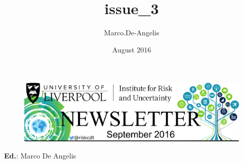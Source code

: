 \documentclass[11pt]{article}%
\title{issue_3}
\author{Marco.De-Angelis}
\date{August 2016}
\begin{document}
\thispagestyle{firststyle}

\pagecolor{covercolor}\afterpage{\nopagecolor}


\begin{figure}[H]
\centering\includegraphics[width=1.0\linewidth]{newsletterLogo_5.png}
\end{figure} 



{\bf Ed.}: Marco De Angelis\ 
\end{document}
